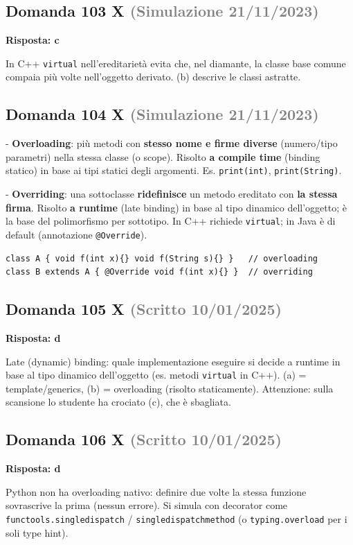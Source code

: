 \documentclass[a4paper,11pt]{article}
\begin{document}
\subsection*{Domanda 103 X \hfill {\small \textcolor{gray}{(Simulazione 21/11/2023)}}}
\textbf{Risposta: c}\par
In C++ \texttt{virtual} nell'ereditarietà evita che, nel diamante, la classe base comune compaia più volte nell'oggetto derivato. (b) descrive le classi astratte.



\subsection*{Domanda 104 X \hfill {\small \textcolor{gray}{(Simulazione 21/11/2023)}}}
- \textbf{Overloading}: più metodi con \textbf{stesso nome e firme diverse} (numero/tipo parametri) nella stessa classe (o scope). Risolto \textbf{a compile time} (binding statico) in base ai tipi statici degli argomenti. Es. \texttt{print(int)}, \texttt{print(String)}.

- \textbf{Overriding}: una sottoclasse \textbf{ridefinisce} un metodo ereditato con \textbf{la stessa firma}. Risolto \textbf{a runtime} (late binding) in base al tipo dinamico dell'oggetto; è la base del polimorfismo per sottotipo. In C++ richiede \texttt{virtual}; in Java è di default (annotazione \texttt{@Override}).

\begin{verbatim}
class A { void f(int x){} void f(String s){} }   // overloading
class B extends A { @Override void f(int x){} }  // overriding
\end{verbatim}




\subsection*{Domanda 105 X \hfill {\small \textcolor{gray}{(Scritto 10/01/2025)}}}
\textbf{Risposta: d}\par
Late (dynamic) binding: quale implementazione eseguire si decide a runtime in base al tipo dinamico dell'oggetto (es. metodi \texttt{virtual} in C++). (a) = template/generics, (b) = overloading (risolto staticamente). Attenzione: sulla scansione lo studente ha crociato (c), che è sbagliata.



\subsection*{Domanda 106 X \hfill {\small \textcolor{gray}{(Scritto 10/01/2025)}}}
\textbf{Risposta: d}\par
Python non ha overloading nativo: definire due volte la stessa funzione sovrascrive la prima (nessun errore). Si simula con decorator come \texttt{functools.singledispatch} / \texttt{singledispatchmethod} (o \texttt{typing.overload} per i soli type hint).
\end{document}
